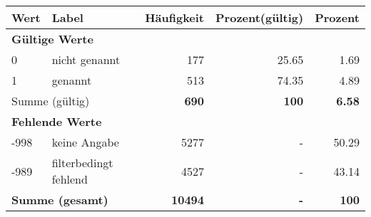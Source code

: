      \begin{longtable}{lXrrr}
     \toprule
     \textbf{Wert} & \textbf{Label} & \textbf{Häufigkeit} & \textbf{Prozent(gültig)} & \textbf{Prozent} \\
     \endhead
     \midrule
     \multicolumn{5}{l}{\textbf{Gültige Werte}}\\

     0 &
     \multicolumn{1}{X}{ nicht genannt   } &


       \num{177} &
       \num[round-mode=places,round-precision=2]{25,65} &
         \num[round-mode=places,round-precision=2]{1,69} \\

     1 &
     \multicolumn{1}{X}{ genannt   } &


       \num{513} &
       \num[round-mode=places,round-precision=2]{74,35} &
         \num[round-mode=places,round-precision=2]{4,89} \\
     \midrule
     \multicolumn{2}{l}{Summe (gültig)} &
       \textbf{\num{690}} &
     \textbf{100} &
       \textbf{\num[round-mode=places,round-precision=2]{6,58}} \\
     \multicolumn{5}{l}{\textbf{Fehlende Werte}}\\
       -998 &
       keine Angabe &
         \num{5277} &
        - &
         \num[round-mode=places,round-precision=2]{50,29} \\
       -989 &
       filterbedingt fehlend &
         \num{4527} &
        - &
         \num[round-mode=places,round-precision=2]{43,14} \\
     \midrule
     \multicolumn{2}{l}{\textbf{Summe (gesamt)}} &
          \textbf{\num{10494}} &
        \textbf{-} &
        \textbf{100} \\
     \bottomrule
     \end{longtable}
     
